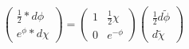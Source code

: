 \begin{equation}
\left(
\begin{array}{c}
\frac{1}{2}\ast d\phi  \\
e^{\phi }\ast d\chi
\end{array}
\right) =\left(
\begin{array}{cc}
1 & \frac{1}{2}\chi  \\
0 & e^{-\phi }
\end{array}
\right) \left(
\begin{array}{c}
\frac{1}{2}d\widetilde{\phi } \\
d\widetilde{\chi }
\end{array}
\right)
\end{equation}

